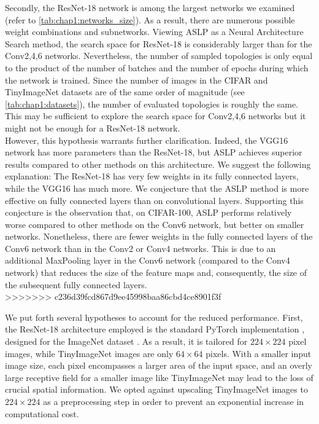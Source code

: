 Secondly, the ResNet-18 network is among the largest networks we examined (refer
to \cref{tab:chap1:networks_size}). As a result, there are numerous possible
weight combinations and subnetworks. Viewing \ac{ASLP} as a Neural Architecture
Search method, the search space for ResNet-18 is considerably larger than for
the Conv{2,4,6} networks. Nevertheless, the number of sampled topologies is only
equal to the product of the number of batches and the number of epochs during
which the network is trained. Since the number of images in the CIFAR and
TinyImageNet datasets are of the same order of magnitude (see
\cref{tab:chap1:datasets}), the number of evaluated topologies is roughly the
same. This may be sufficient to explore the search space for Conv{2,4,6}
networks but it might not be enough for a ResNet-18 network.\\


However, this hypothesis warrants further clarification. Indeed, the VGG16
network has more parameters than the ResNet-18, but \ac{ASLP} achieves superior
results compared to other methods on this architecture. We suggest the following
explanation: The ResNet-18 has very few weights in its fully connected layers,
while the VGG16 has much more. We conjecture that the \ac{ASLP} method is more
effective on fully connected layers than on convolutional layers. Supporting
this conjecture is the observation that, on CIFAR-100, \ac{ASLP} performs
relatively worse compared to other methods on the Conv6 network, but better on
smaller networks. Nonetheless, there are fewer weights in the fully connected
layers of the Conv6 network than in the Conv2 or Conv4 networks. This is due to
an additional MaxPooling layer in the Conv6 network (compared to the Conv4
network) that reduces the size of the feature maps and, consequently, the size
of the subsequent fully connected layers.\\
>>>>>>> c236d39fcd867d9ee45998baa86cbd4ce8901f3f


We put forth several hypotheses to account for the reduced performance. First,
the ResNet-18 architecture employed is the standard PyTorch implementation
\cite{pytorch_resnet18}, designed for the ImageNet dataset
\cite{deng2009imagenet}. As a result, it is tailored for $224 \times 224$ pixel
images, while TinyImageNet images are only $64 \times 64$ pixels. With a
smaller input image size, each pixel encompasses a larger area of the input
space, and an overly large receptive field for a smaller image like TinyImageNet
may lead to the loss of crucial spatial information. We opted against upscaling
TinyImageNet images to $224 \times 224$ as a preprocessing step in order to
prevent an exponential increase in computational cost.\\

